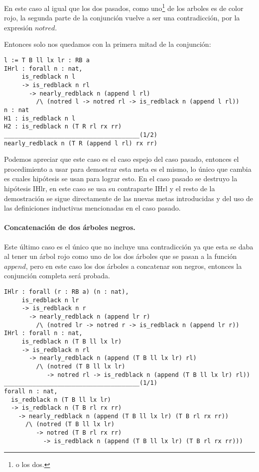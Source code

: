 En este caso al igual que los dos pasados, como uno\footnote{o los dos.} de los arboles es de
color rojo, la segunda parte de la conjunci\'on vuelve a ser una contradicci\'on, por la expresión
$notred$.

Entonces solo nos quedamos con la primera mitad de la conjunci\'on:

\begin{verbatim}
l := T B ll lx lr : RB a
IHrl : forall n : nat,
     is_redblack n l
     -> is_redblack n rl
       -> nearly_redblack n (append l rl)
         /\ (notred l -> notred rl -> is_redblack n (append l rl))
n : nat
H1 : is_redblack n l
H2 : is_redblack n (T R rl rx rr)
______________________________________(1/2)
nearly_redblack n (T R (append l rl) rx rr)
\end{verbatim}

Podemos apreciar que este caso es el caso espejo del caso pasado, entonces el procedimiento a usar
para demostrar esta meta es el mismo, lo \'unico que cambia es cuales hip\'otesis se usan para
lograr esto. En el caso pasado se destruyo la hip\'otesis IHlr, en este caso se usa su contraparte
IHrl y el resto de la demostraci\'on se sigue directamente de las nuevas metas introducidas y del
uso de las definiciones inductivas mencionadas en el caso pasado.

\paragraph{Concatenaci\'on de dos \'arboles negros.}

Este \'ultimo caso es el \'unico que no incluye una contradicci\'on ya que esta se
daba al tener un \'arbol rojo como uno de los dos \'arboles que se pasan a la funci\'on $append$,
pero en este caso los dos \'arboles a concatenar son negros, entonces la conjunci\'on completa
ser\'a probada.

\begin{verbatim}
IHlr : forall (r : RB a) (n : nat),
     is_redblack n lr
     -> is_redblack n r
       -> nearly_redblack n (append lr r)
         /\ (notred lr -> notred r -> is_redblack n (append lr r))
IHrl : forall n : nat,
     is_redblack n (T B ll lx lr)
     -> is_redblack n rl
       -> nearly_redblack n (append (T B ll lx lr) rl)
         /\ (notred (T B ll lx lr)
            -> notred rl -> is_redblack n (append (T B ll lx lr) rl))
______________________________________(1/1)
forall n : nat,
  is_redblack n (T B ll lx lr)
  -> is_redblack n (T B rl rx rr)
    -> nearly_redblack n (append (T B ll lx lr) (T B rl rx rr))
      /\ (notred (T B ll lx lr)
         -> notred (T B rl rx rr)
           -> is_redblack n (append (T B ll lx lr) (T B rl rx rr)))
\end{verbatim}

